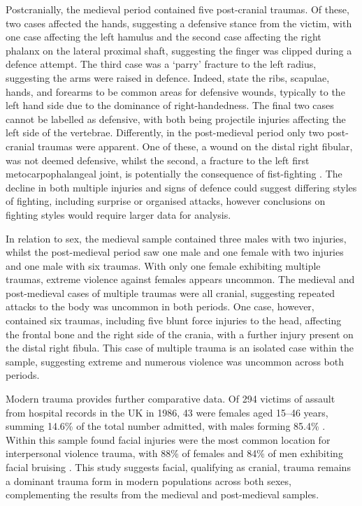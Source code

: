Postcranially, the medieval period contained five post-cranial traumas. Of these, two cases affected the hands, suggesting a defensive stance from the victim, with one case affecting the left hamulus and the second case affecting the right phalanx on the lateral proximal shaft, suggesting the finger was clipped during a defence attempt. The third case was a ‘parry’ fracture to the left radius, suggesting the arms were raised in defence. Indeed, \textcite{roberts2003} state the ribs, scapulae, hands, and forearms to be common areas for defensive wounds, typically to the left hand side due to the dominance of right-handedness.  
The final two cases cannot be labelled as defensive, with both being projectile injuries affecting the left side of the vertebrae.  Differently, in the post-medieval period only two post-cranial traumas were apparent. One of these, a wound on the distal right fibular, was not deemed defensive, whilst the second, a fracture to the left first metocarpophalangeal joint, is potentially the consequence of fist-fighting \parencite{roberts2003}. 
The decline in both multiple injuries and signs of defence could suggest differing styles of fighting, including surprise or organised attacks, however conclusions on fighting styles would require larger data for analysis. 

In relation to sex, the medieval sample contained three males with two injuries, whilst the post-medieval period saw one male and one female with two injuries and one male with six traumas. With only one female exhibiting multiple traumas, extreme violence against females appears uncommon. The medieval and post-medieval cases of multiple traumas were all cranial, suggesting repeated attacks to the body was uncommon in both periods. One case, however, contained six traumas, including five blunt force injuries to the head, affecting the frontal bone and the right side of the crania, with a further injury present on the distal right fibula. This case of multiple trauma is an isolated case within the sample, suggesting extreme and numerous violence was uncommon across both periods.  

Modern trauma provides further comparative data. Of 294 victims of assault from hospital records in the UK in 1986, 43 were females aged 15–46 years, summing 14.6\% of the total number admitted, with males forming 85.4\% \parencite{shepherd1988}.  
Within this sample \textcite{shepherd1988} found facial injuries were the most common location for interpersonal violence trauma, with 88\% of 
females and 84\% of men exhibiting facial bruising \parencite[223]{shepherd1988}. This study suggests facial, qualifying as cranial, trauma remains a dominant trauma form in modern populations across both sexes, complementing the results from the medieval and post-medieval samples. 

